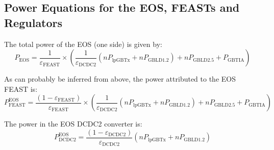 
\subsection{Power Equations for the EOS, FEASTs and Regulators}

The total power of the EOS (one side) is given by:
\begin{equation}
P_\text{EOS} = \frac{1}{\varepsilon_\text{FEAST}}\times
  \left( \frac{1}{\varepsilon_\text{DCDC2}} (n P_\text{lpGBTx} + n P_\text{GBLD1.2}) + n P_\text{GBLD2.5} + P_\text{GBTIA} \right)
\end{equation}

As can probably be inferred from above, the power attributed to the EOS FEAST is:
\begin{equation}
P^\text{EOS}_\text{FEAST} = \frac{(1-\varepsilon_\text{FEAST})}{\varepsilon_\text{FEAST}}\times
  \left( \frac{1}{\varepsilon_\text{DCDC2}} (n P_\text{lpGBTx} + n P_\text{GBLD1.2}) + n P_\text{GBLD2.5} + P_\text{GBTIA} \right)
\end{equation}

The power in the EOS DCDC2 converter is:
\begin{equation}
P^\text{EOS}_\text{DCDC2} = \frac{(1-\varepsilon_\text{DCDC2})}{\varepsilon_\text{DCDC2}} \left(n P_\text{lpGBTx} + n P_\text{GBLD1.2}\right)
\end{equation}


